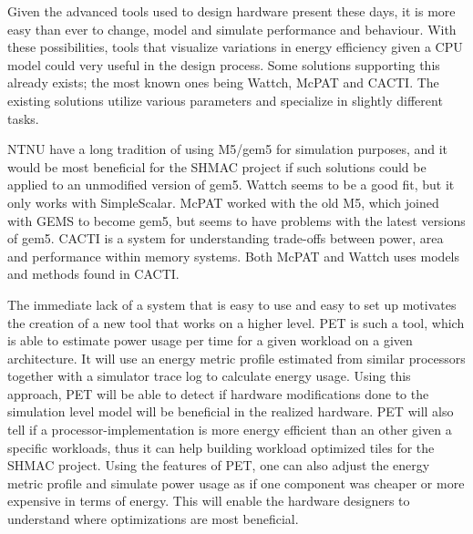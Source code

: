 Given the advanced tools used to design hardware present these days, it is more
easy than ever to change, model and simulate performance and behaviour. With
these possibilities, tools that visualize variations in energy efficiency given
a CPU model could very useful in the design process. Some solutions supporting
this already exists; the most known ones being Wattch\cite{brooks2000wattch},
McPAT\cite{hpmcpat,li2013mcpat} and CACTI\cite{hpcacti}. The existing solutions
utilize various parameters and specialize in slightly different tasks.

NTNU have a long tradition of using M5/gem5 for simulation purposes, and it
would be most beneficial for the SHMAC project if such solutions could be
applied to an unmodified version of gem5. Wattch seems to be a good fit, but it
only works with SimpleScalar\cite{wattchanalysis}. McPAT worked with the old
M5\cite{m5mcpatparser}, which joined with GEMS to become gem5\cite{gem5hipeac},
but seems to have problems with the latest versions of
gem5\cite{mcpatgem5problems}. CACTI is a system for understanding trade-offs
between power, area and performance within memory
systems\cite{hpcacti,muralimanohar2010memory}. Both McPAT and Wattch uses models
and methods found in CACTI\cite{li2009mcpat}.

The immediate lack of a system that is easy to use and easy to set up motivates
the creation of a new tool that works on a higher level. PET is such a tool,
which is able to estimate power usage per time for a given workload on a given
architecture.  It will use an energy metric profile estimated from similar
processors together with a simulator trace log to calculate energy usage.  Using
this approach, PET will be able to detect if hardware modifications done to the
simulation level model will be beneficial in the realized hardware. PET will
also tell if a processor-implementation is more energy efficient than an other
given a specific workloads, thus it can help building workload optimized tiles
for the SHMAC project\cite{shmacwebpage}. Using the features of PET, one can
also adjust the energy metric profile and simulate power usage as if one
component was cheaper or more expensive in terms of energy. This will enable the
hardware designers to understand where optimizations are most beneficial.




